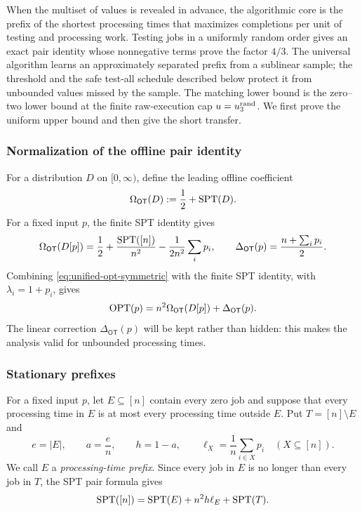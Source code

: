 When the multiset of values is revealed in advance, the algorithmic core is
the prefix of the shortest processing times that maximizes completions per
unit of testing and processing work.  Testing jobs in a uniformly random
order gives an exact pair identity
whose nonnegative terms prove the factor $4/3$.  The universal algorithm
learns an approximately separated prefix from a sublinear sample; the
threshold and the safe test-all schedule described below protect it from
unbounded values missed by the sample.  The matching lower
bound is the zero--two lower bound at the finite
raw-execution cap $u=u_{3}^{\mathrm{rand}}$.  We first prove the uniform upper bound and
then give the short transfer.

\subsubsection{Normalization of the offline pair identity}

For a distribution $D$ on $[0,\infty)$, define the leading offline
coefficient
\begin{equation}
 \Omega_{\mathsf{OT}}(D)
 \mathrel{:=}\frac12+\operatorname{SPT}(D).
 \label{eq:rand-omega-ot}
\end{equation}
For a fixed input $p$, the finite SPT identity gives
\begin{equation}
 \Omega_{\mathsf{OT}}(D[p])
 =\frac12+\frac{\operatorname{SPT}([n])}{n^2}
  -\frac1{2n^2}\sum_i p_i,
 \qquad
 \Delta_{\mathsf{OT}}(p)=\frac{n+\sum_i p_i}{2}.
 \label{eq:rand-KO}
\end{equation}
Combining \cref{eq:unified-opt-symmetric} with the finite SPT identity, with
$\lambda_i=1+p_i$, gives
\begin{equation}
 \operatorname{OPT}(p)=n^2\Omega_{\mathsf{OT}}(D[p])+\Delta_{\mathsf{OT}}(p).
 \label{eq:rand-opt-normalized}
\end{equation}
The linear correction $\Delta_{\mathsf{OT}}(p)$ will be kept rather than
hidden: this makes the analysis valid for unbounded processing times.

\subsubsection{Stationary prefixes}

For a fixed input $p$, let $E\subseteq[n]$ contain every zero job and suppose
that every processing time in $E$ is at most every processing time outside
$E$.  Put $T=[n]\setminus E$ and
\begin{equation}
 e=|E|,\qquad a=\frac en,\qquad h=1-a,\qquad
 \ell_X=\frac1n\sum_{i\in X}p_i\quad(X\subseteq[n]).
 \label{eq:stationary-prefix-notation}
\end{equation}
We call $E$ a \emph{processing-time prefix}.  Since every job in $E$ is no
longer than every job in $T$, the SPT pair formula gives
\begin{equation}
 \operatorname{SPT}([n])=\operatorname{SPT}(E)+n^2h\ell_E+\operatorname{SPT}(T).
 \label{eq:stationary-spt-split}
\end{equation}

